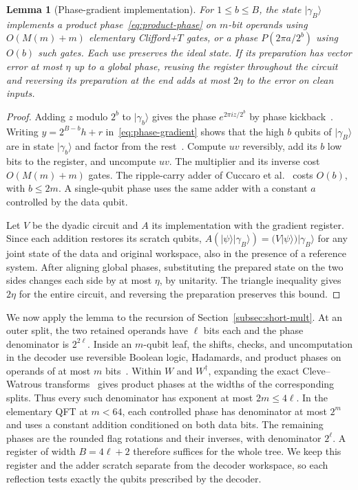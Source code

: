 \documentclass[11pt]{article}
\newtheorem{lemma}{Lemma}[section]
\newcommand{\CFT}{Clifford+$T$}
\begin{document}
\begin{lemma}[Phase-gradient implementation]\label{lem:phase-gradient}
For $1\le b\le B$, the state $|\gamma_B\rangle$ implements a product phase~\eqref{eq:product-phase} on $m$-bit operands using $O(M(m)+m)$ elementary \CFT{} gates, or a phase $P(2\pi a/2^b)$ using $O(b)$ such gates. Each use preserves the ideal state. If its preparation has vector error at most $\eta$ up to a global phase, reusing the register throughout the circuit and reversing its preparation at the end adds at most $2\eta$ to the error on clean inputs.
\end{lemma}

\begin{proof}
Adding $z$ modulo $2^b$ to $|\gamma_b\rangle$ gives the phase $e^{2\pi i z/2^b}$ by phase kickback~\cite[Section~7]{cemp1998}. Writing $y=2^{B-b}h+r$ in~\eqref{eq:phase-gradient} shows that the high $b$ qubits of $|\gamma_B\rangle$ are in state $|\gamma_b\rangle$ and factor from the rest~\cite[Section~IV.C]{wu2026}. Compute $uv$ reversibly, add its $b$ low bits to the register, and uncompute $uv$. The multiplier and its inverse cost $O(M(m)+m)$ gates. The ripple-carry adder of Cuccaro et al.~\cite{cdkm2004} costs $O(b)$, with $b\le 2m$. A single-qubit phase uses the same adder with a constant $a$ controlled by the data qubit.

Let $V$ be the dyadic circuit and $A$ its implementation with the gradient register. Since each addition restores its scratch qubits, $A(|\psi\rangle|\gamma_B\rangle)=(V|\psi\rangle)|\gamma_B\rangle$ for any joint state of the data and original workspace, also in the presence of a reference system. After aligning global phases, substituting the prepared state on the two sides changes each side by at most $\eta$, by unitarity. The triangle inequality gives $2\eta$ for the entire circuit, and reversing the preparation preserves this bound.
\end{proof}

We now apply the lemma to the recursion of Section~\ref{subsec:short-mult}. At an outer split, the two retained operands have $\ell$ bits each and the phase denominator is $2^{2\ell}$. Inside an $m$-qubit leaf, the shifts, checks, and uncomputation in the decoder use reversible Boolean logic, Hadamards, and product phases on operands of at most $m$ bits~\cite[Section~3]{kmps2026}. Within $W$ and $W^\dagger$, expanding the exact Cleve--Watrous transforms~\cite{cw2000} gives product phases at the widths of the corresponding splits. Thus every such denominator has exponent at most $2m\le 4\ell$. In the elementary QFT at $m<64$, each controlled phase has denominator at most $2^m$ and uses a constant addition conditioned on both data bits. The remaining phases are the rounded flag rotations and their inverses, with denominator $2^\ell$. A register of width $B=4\ell+2$ therefore suffices for the whole tree. We keep this register and the adder scratch separate from the decoder workspace, so each reflection tests exactly the qubits prescribed by the decoder.
\end{document}
